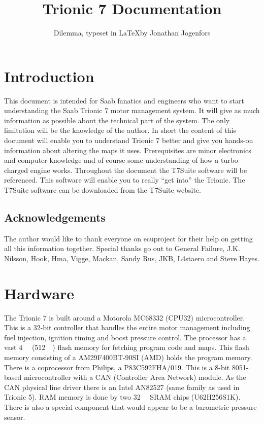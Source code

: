 \documentclass[11pt,a4paper]{book}
\begin{document}
\title{Trionic 7 Documentation}
\author{Dilemma, typeset in \LaTeX by Jonathan Jogenfors}

\maketitle
\clearpage
\listoftodos
\chapter{Introduction}
This document is intended for Saab fanatics and engineers who want to start
understanding the Saab Trionic 7 motor management system. It will give as much
information as possible about the technical part of the system. The only
limitation will be the knowledge of the author. In short the content of this
document will enable you to understand Trionic 7 better and give you hands-on
information about altering the maps it uses. Prerequisites are minor electronics
and computer knowledge and of course some understanding of how a turbo charged
engine works. Throughout the document the T7Suite software will be referenced.
This software will enable you to really \enquote{get into} the Trionic. The T7Suite
software can be downloaded from the T7Suite website.

\section{Acknowledgements}
The author would like to thank everyone on ecuproject for their help on getting
all this information together. Special thanks go out to General Failure, J.K.
Nilsson, Hook, Hma, Vigge, Mackan, Sandy Rus, JKB, L4staero and Steve Hayes.

\tableofcontents

\chapter{Hardware}
The Trionic 7 is built around a Motorola MC68332 (CPU32) microcontroller. This
is a 32-bit controller that handles the entire motor management including fuel
injection, ignition timing and boost pressure control. The processor has a vast
\SI{4}{\mega\byte} (\SI{512}{\kilo\byte}) flash memory for fetching program code
and maps. This flash memory consisting of a AM29F400BT-90SI (AMD) holds the
program memory. There is a coprocessor from Philips, a P83C592FHA/019. This is a
8-bit 8051-based microcontroller with a CAN (Controller Area Network) module. As
the CAN physical line driver there is an Intel AN82527 (same family as used in
Trionic 5). RAM memory is done by two \SI{32}{\kilo\bit} SRAM chips
(U62H256S1K). There is also a special component that would appear to be a
barometric pressure sensor.
\end{document}
